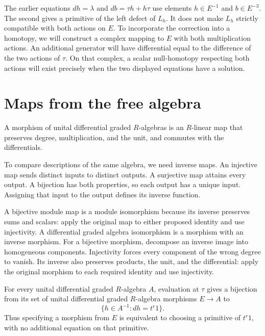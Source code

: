 The earlier equations $dh=\lambda$ and $db=\tau h+h\tau$ use elements
$h\in E^{-1}$ and $b\in E^{-3}$.
The second gives a primitive of the left defect of $L_h$.
It does not make $L_h$ strictly compatible with both actions on $E$.
To incorporate the correction into a homotopy, we will construct a
complex mapping to $E$ with both multiplication actions.
An additional generator will have differential equal to the difference
of the two actions of $\tau$.
On that complex, a scalar null-homotopy respecting both actions will
exist precisely when the two displayed equations have a solution.

\section{Maps from the free algebra}

A morphism of unital differential graded $R$-algebras is an $R$-linear
map that preserves degree, multiplication, and the unit, and commutes
with the differentials.

To compare descriptions of the same algebra, we need inverse maps.
An injective map sends distinct inputs to distinct outputs.
A surjective map attains every output.
A bijection has both properties, so each output has a unique input.
Assigning that input to the output defines its inverse function.

A bijective module map is a module isomorphism because its inverse
preserves sums and scalars: apply the original map to either proposed
identity and use injectivity.
A differential graded algebra isomorphism is a morphism with an inverse
morphism.
For a bijective morphism, decompose an inverse image into homogeneous
components. Injectivity forces every component of the wrong degree to vanish.
Its inverse also preserves products, the unit, and the differential:
apply the original morphism to each required identity and use injectivity.

\begin{proposition}
\label{prop:rel-witness-mapping}
For every unital differential graded $R$-algebra $A$, evaluation at
$\tau$ gives a bijection from its set of unital differential graded
$R$-algebra morphisms $E\to A$ to
\[
 \{h\in A^{-1}:dh=t^r1\}.
\]
Thus specifying a morphism from $E$ is equivalent to choosing a primitive
of $t^r1$, with no additional equation on that primitive.
\end{proposition}

